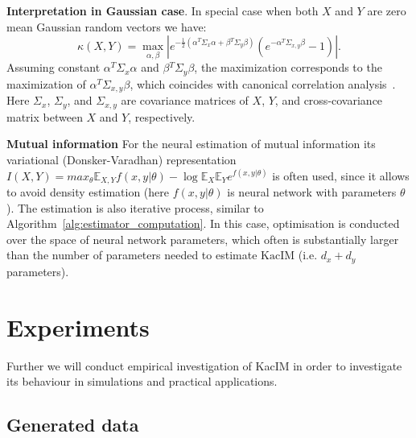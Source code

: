 \documentclass{article}
\newcommand{\KacIM}{\mathrm{KacIM}}
\begin{document}

\textbf{Interpretation in Gaussian case}. In special case when both $X$ and $Y$ are zero mean Gaussian random vectors we have:
\begin{equation}
\label{eq:gaussian_kacim}
\kappa(X,Y) = \max_{\alpha, \beta} | e^{-\frac{1}{2} (\alpha^{T}\Sigma_{x}\alpha + \beta{^T}\Sigma_{y}\beta)}(e^{-\alpha{^T}\Sigma_{x,y}\beta} - 1)|.
\end{equation}
Assuming constant $\alpha^{T}\Sigma_{x}\alpha$ and  $\beta{^T}\Sigma_{y}\beta$, the maximization corresponds to the maximization of  $\alpha{^T}\Sigma_{x,y}\beta$, which coincides with canonical correlation analysis~\cite{10.5555/3279302}. Here $\Sigma_{x}$, $\Sigma_{y}$, and  $\Sigma_{x,y}$ are covariance matrices of $X$, $Y$, and cross-covariance matrix between $X$ and $Y$, respectively. %



\textbf{Mutual information} For the neural estimation of mutual information its variational (Donsker-Varadhan) representation $I(X,Y) = max_{\theta}  \mathbb{E}_{X,Y} f(x,y|\theta) - \log \mathbb{E}_{X}\mathbb{E}_{Y} e^{f(x,y|\theta)}$  \cite{pmlr-v80-belghazi18a} is often used, since it allows to avoid density estimation (here $f(x,y|\theta)$ is neural network with parameters $\theta$). The estimation is also iterative process, similar to Algorithm~\ref{alg:estimator_computation}. In this case, optimisation is conducted over the space of neural network parameters, which often is substantially larger than the number of parameters needed to estimate $\KacIM$ (i.e. $d_{x} + d_{y}$ parameters).


\section{Experiments}
\label{section:experiments}

Further we will conduct empirical investigation of KacIM in order to investigate its behaviour in simulations and practical applications.


\subsection{Generated data}
\end{document}
